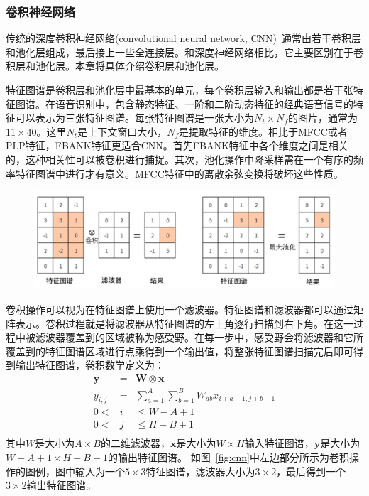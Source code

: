 \subsubsection{卷积神经网络}
传统的深度卷积神经网络(convolutional neural network, CNN)~\cite{lecun1998gradient}通常由若干卷积层和池化层组成，最后接上一些全连接层。和深度神经网络相比，它主要区别在于卷积层和池化层。本章将具体介绍卷积层和池化层。

特征图谱是卷积层和池化层中最基本的单元，每个卷积层输入和输出都是若干张特征图谱。在语音识别中，包含静态特征、一阶和二阶动态特征的经典语音信号的特征可以表示为三张特征图谱。每张特征图谱是一张大小为$N_t \times N_f$的图片，通常为$11 \times 40$。这里$N_t$是上下文窗口大小，$N_f$是提取特征的维度。相比于MFCC或者PLP特征，FBANK特征更适合CNN。首先FBANK特征中各个维度之间是相关的，这种相关性可以被卷积进行捕捉。其次，池化操作中降采样需在一个有序的频率特征图谱中进行才有意义。MFCC特征中的离散余弦变换将破坏这些性质。

\begin{figure}[!htp]
  \centering
    \captionstyle{\centering}
    \includegraphics[width=.8\textwidth]{figure/cnn.png}
\end{figure}

卷积操作可以视为在特征图谱上使用一个滤波器。特征图谱和滤波器都可以通过矩阵表示。卷积过程就是将滤波器从特征图谱的左上角逐行扫描到右下角。在这一过程中被滤波器覆盖到的区域被称为感受野。在每一步中，感受野会将滤波器和它所覆盖到的特征图谱区域进行点乘得到一个输出值，将整张特征图谱扫描完后即可得到输出特征图谱，卷积数学定义为：
\begin{eqnarray}
    \mathbf{y} &=& \mathbf{W} \otimes \mathbf{x} \\
    y_{i,j} &=& \sum_{a=1}^A \sum_{b=1}^B W_{ab} x_{i+a-1, j+b-1} \\
    0 < &i& \le W-A+1 \\
    0 < &j& \le H-B+1 \\
\end{eqnarray}
其中$W$是大小为$A \times B$的二维滤波器，$\mathbf{x}$是大小为$W \times H$输入特征图谱，$\mathbf{y}$是大小为$W-A+1 \times H-B+1$的输出特征图谱。
如图~\ref{fig:cnn}中左边部分所示为卷积操作的图例，图中输入为一个$5 \times 3$特征图谱，滤波器大小为$3 \times 2$，最后得到一个$3 \times 2$输出特征图谱。

